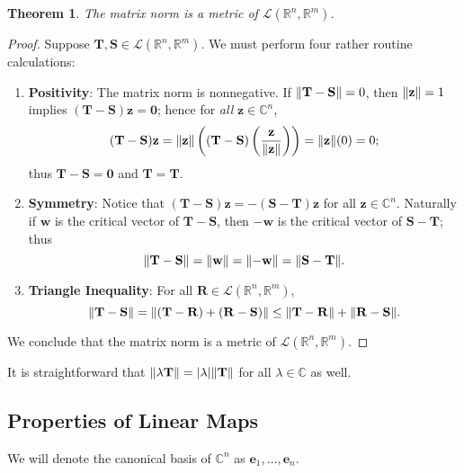 \documentclass[11pt]{article}
\renewcommand{\vec}[1]{\mathbf{#1}}
\newcommand{\mat}[1]{\mathbf{#1}}
\newtheorem{theorem}{Theorem}
\begin{document}
\begin{theorem}
	The matrix norm is a metric of $\mathcal{L}(\mathbb{R}^{n}, \mathbb{R}^{m})$.
\end{theorem}
\begin{adjustwidth}{0.5cm}{}
	\begin{proof}
		Suppose $\mat{T}, \mat{S} \in \mathcal{L}(\mathbb{R}^{n}, \mathbb{R}^{m})$. We must perform four rather routine calculations:
		\begin{enumerate}
			\item \textbf{Positivity}: The matrix norm is nonnegative. If $\norm{\mat{T} - \mat{S}} = 0$, then $\norm{\vec{z}} = 1$ implies $(\mat{T} - \mat{S}) \vec{z} = \vec{0}$; hence for \textit{all} $\vec{z} \in \mathbb{C}^{n}$,
			\[
				(\mat{T} - \mat{S}) \vec{z} = \norm{\vec{z}} \left( (\mat{T} - \mat{S}) \left( \frac{\vec{\vec{z}}}{\norm{\vec{z}}} \right) \right) = \norm{\vec{z}} (0) = 0;
			\]	
			thus $\mat{T} - \mat{S} = \mat{0}$ and $\mat{T} = \mat{T}$.
			\item \textbf{Symmetry}: Notice that $(\mat{T} - \mat{S}) \vec{z} = - (\mat{S} - \mat{T}) \vec{z}$ for all $\vec{z} \in \mathbb{C}^{n}$. Naturally if $\vec{w}$ is the critical vector of $\mat{T} - \mat{S}$, then $- \vec{w}$ is the critical vector of $\mat{S} - \mat{T}$; thus
			\[
				\norm{\mat{T} - \mat{S}} = \norm{\vec{w}} = \norm{-\vec{w}} = \norm{\mat{S} - \mat{T}}.
			\]	
			\item \textbf{Triangle Inequality}: For all $\mat{R} \in \mathcal{L}(\mathbb{R}^{n}, \mathbb{R}^{m})$,
			\[
				\norm{\mat{T - S}} = \norm{\mat{(T - R) + (R - S)}} \le \norm{\mat{T - R}} + \norm{\mat{R - S}}.
			\]
		\end{enumerate}
		We conclude that the matrix norm is a metric of $\mathcal{L}(\mathbb{R}^{n}, \mathbb{R}^{m})$.
	\end{proof}
\end{adjustwidth}

It is straightforward that $\norm{\lambda \mat{T}} = \abs{\lambda} \norm{\mat{T}}$ for all $\lambda \in \mathbb{C}$ as well.

\newpage


\subsection{Properties of Linear Maps}

We will denote the canonical basis of $\mathbb{C}^{n}$ as $\vec{e}_{1}, \ldots, \vec{e}_{n}$.
\end{document}
